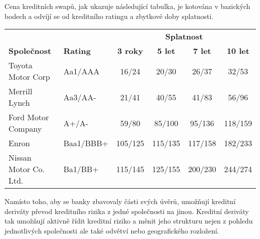 \documentclass[a4paper]{book}
\begin{document}
Cena kreditních swapů, jak ukazuje následující tabulka, je kotována v bazických bodech a odvíjí se od kreditního ratingu a zbytkové doby splatnosti.
\begin{center}
\begin{tabular}{l l c c c c}
\multicolumn{2}{c}{\textbf{}} &
\multicolumn{4}{c}{\textbf{Splatnost}} \\
\textbf{Společnost} &
\textbf{Rating} &
\textbf{3 roky} &
\textbf{5 let} &
\textbf{7 let} &
\textbf{10 let} \\
\hline
Toyota Motor Corp     & Aa1/AAA   &  16/24  &  20/30  &  26/37  &  32/53  \\
Merrill Lynch         & Aa3/AA-   &  21/41  &  40/55  &  41/83  &  56/96  \\
Ford Motor Company    & A+/A-     &  59/80  &  85/100 &  95/136 & 118/159 \\
Enron                 & Baa1/BBB+ & 105/125 & 115/135 & 117/158 & 182/233 \\
Nissan Motor Co. Ltd. & Ba1/BB+   & 115/145 & 125/155 & 200/230 & 244/274 \\
\hline
\end{tabular}
\end{center}
Namísto toho, aby se banky zbavovaly části svých úvěrů, umožňují kreditní deriváty převod kreditního rizika z jedné společnosti na jinou. Kreditní deriváty tak umožňují aktivně řídit kreditní riziko a měnit jeho strukturu nejen z pohledu jednotlivých společnosti ale také odvětví nebo geografického rozložení.
\end{document}
